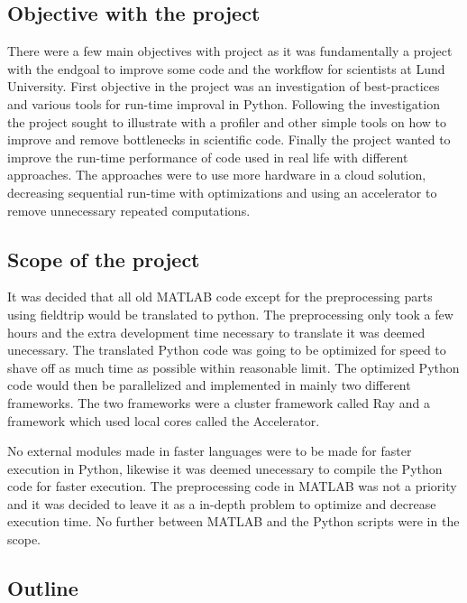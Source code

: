 \documentclass[12pt, a4paper]{article}
\begin{document}
\subsection{Objective with the project}%

There were a few main objectives with project as it was fundamentally a project with the endgoal to improve some code and the workflow for scientists at Lund University.
First objective in the project was an investigation of best-practices and various tools for run-time improval in Python.
Following the investigation the project sought to illustrate with a profiler and other simple tools on how to improve and remove bottlenecks in scientific code.
Finally the project wanted to improve the run-time performance of code used in real life with different approaches.
The approaches were to use more hardware in a cloud solution, decreasing sequential run-time with optimizations and using an accelerator to remove unnecessary repeated computations.


\subsection{Scope of the project}%

It was decided that all old MATLAB code except for the preprocessing parts using fieldtrip would be translated to python.
The preprocessing only took a few hours and the extra development time necessary to translate it was deemed unecessary. 
The translated Python code was going to be optimized for speed to shave off as much time as possible within reasonable limit.
The optimized Python code would then be parallelized and implemented in mainly two different frameworks.
The two frameworks were a cluster framework called Ray and a framework which used local cores called the Accelerator.

No external modules made in faster languages were to be made for faster execution in Python, likewise it was deemed unecessary to compile the Python code for faster execution.
The preprocessing code in MATLAB was not a priority and it was decided to leave it as a in-depth problem to optimize and decrease execution time.
No further between MATLAB and the Python scripts were in the scope.


\subsection{Outline}
\end{document}
